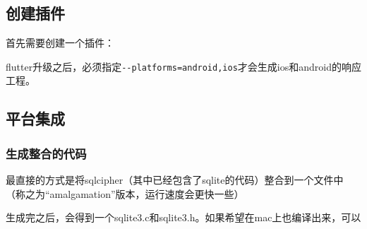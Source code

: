\documentclass[12pt]{article}
\begin{document}
\subsection{创建插件}\label{ux521bux5efaux63d2ux4ef6}

首先需要创建一个插件：

\begin{Shaded}
\begin{Highlighting}[]
\DataTypeTok{\textbackslash{}}
  \OperatorTok{=}\DataTypeTok{\textbackslash{}}
  \OperatorTok{=}\DataTypeTok{\textbackslash{}}
  \OperatorTok{=}\DataTypeTok{\textbackslash{}}
  \DataTypeTok{\textbackslash{}}
  \DataTypeTok{\textbackslash{}}
\end{Highlighting}
\end{Shaded}

flutter升级之后，必须指定\texttt{-\/-platforms=android,ios}才会生成ios和android的响应工程。

\subsection{平台集成}\label{ux5e73ux53f0ux96c6ux6210}

\subsubsection{生成整合的代码}\label{ux751fux6210ux6574ux5408ux7684ux4ee3ux7801}

最直接的方式是将sqlcipher（其中已经包含了sqlite的代码）整合到一个文件中（称之为``amalgamation''版本，运行速度会更快一些）

\begin{Shaded}
\begin{Highlighting}[]
 \OperatorTok{=}
\end{Highlighting}
\end{Shaded}

生成完之后，会得到一个sqlite3.c和sqlite3.h。如果希望在mac上也编译出来，可以
\end{document}
